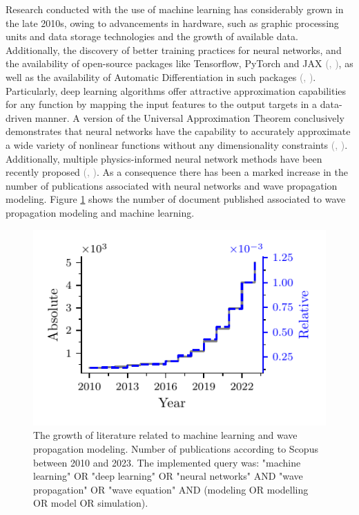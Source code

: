 \documentclass[11pt,twoside]{article}
\renewcommand{\citep}[2][]{\textcolor{gray}{(\citeauthor{#2}, \citeyear[#1]{#2})}}
\begin{document}
Research conducted with the use of machine learning has considerably grown in the late 2010s, owing to advancements in hardware, such as graphic processing units and data storage technologies and the growth of available data. Additionally, the discovery of better training practices for neural networks, and the availability of open-source packages like Tensorflow, PyTorch and JAX \citep{abadi_tensorflow_2016,paszke_pytorch_2019,jax2018github}, as well as the availability of Automatic Differentiation in such packages \citep{paszke_automatic_2017,baydin_automatic_2017}. Particularly, deep learning algorithms offer attractive approximation capabilities for any function by mapping the input features to the output targets in a data-driven manner. A version of the Universal Approximation Theorem conclusively demonstrates that neural networks have the capability to accurately approximate a wide variety of nonlinear functions without any dimensionality constraints \citep{barron_universal_1993}. Additionally, multiple physics-informed neural network methods have been recently proposed \citep{cuomo_scientific_2022}. As a consequence there has been a marked increase in the number of publications associated with neural networks and wave propagation modeling. Figure \ref{dl-wave_propagation-publications} shows the number of document published associated to wave propagation modeling and machine learning. 

\begin{figure}
\centering
    \includegraphics[scale=1]{figs/publications_with_relative.pdf}
    \caption{The growth of literature related to machine learning and wave propagation modeling. Number of publications according to Scopus between 2010 and 2023. The implemented query was: "machine learning" OR "deep learning" OR "neural networks" 
AND "wave propagation" OR "wave equation" 
AND (modeling OR modelling OR model OR simulation).}
    \label{dl-wave_propagation-publications}
\end{figure}
\end{document}
